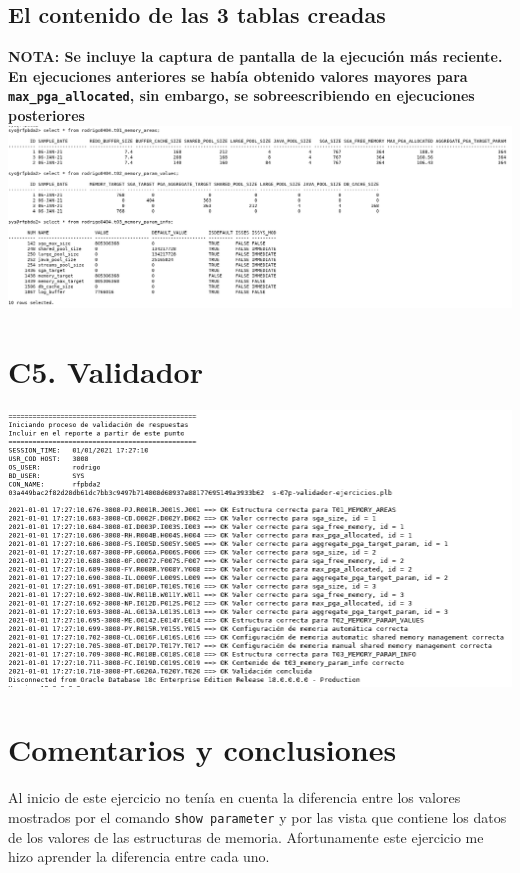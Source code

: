 \documentclass{article}
\begin{document}


\subsection*{El contenido de las 3 tablas creadas}

\textbf{NOTA: Se incluye la captura de pantalla de la ejecución más reciente. En
ejecuciones anteriores se había obtenido valores mayores para
\texttt{max\_pga\_allocated}, sin embargo, se sobreescribiendo en ejecuciones
posteriores }\\

\includegraphics[width=\linewidth]{c4}

\section*{C5. Validador}

\includegraphics[width=\linewidth]{bda-t04-ep04-validador}

\section*{Comentarios y conclusiones}

Al inicio de este ejercicio no tenía en cuenta la diferencia entre los valores
mostrados por el comando \texttt{show parameter} y por las vista que contiene
los datos de los valores de las estructuras de memoria. Afortunamente este
ejercicio me hizo aprender la diferencia entre cada uno.\\
\end{document}
